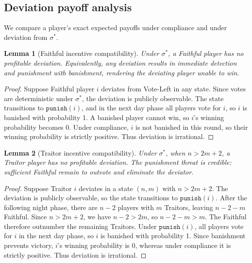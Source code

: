 \documentclass[11pt,a4paper]{article}
\newtheorem{lemma}{Lemma}
\begin{document}
\subsection{Deviation payoff analysis}

We compare a player's exact expected payoffs under compliance and under
deviation from \(\sigma^*\). 

\begin{lemma}[Faithful incentive compatibility]\label{lemma:faithful}
Under \(\sigma^*\), a Faithful player has no profitable deviation.
Equivalently, any deviation results in immediate detection and punishment
with banishment, rendering the deviating player unable to win.
\end{lemma}

\begin{proof}
Suppose Faithful player \(i\) deviates from Vote-Left in any state. Since
votes are deterministic under \(\sigma^*\), the deviation is publicly
observable. The state transitions to \(\mathtt{punish}(i)\), and in the
next day phase all players vote for \(i\), so \(i\) is banished with
probability 1. A banished player cannot win, so \(i\)'s winning probability
becomes 0. Under compliance, \(i\) is not banished in this round, so their
winning probability is strictly positive. Thus deviation is irrational.
\end{proof}

\begin{lemma}[Traitor incentive compatibility]\label{lemma:traitor}
Under \(\sigma^*\), when \(n > 2m + 2\), a Traitor player has no
profitable deviation. The punishment threat is credible: sufficient
Faithful remain to outvote and eliminate the deviator.
\end{lemma}

\begin{proof}
Suppose Traitor \(i\) deviates in a state \((n, m)\) with \(n > 2m + 2\).
The deviation is publicly observable, so the state transitions to
\(\mathtt{punish}(i)\). After the following night phase, there are \(n - 2\)
players with \(m\) Traitors, leaving \(n - 2 - m\) Faithful. Since \(n > 2m +
2\), we have \(n - 2 > 2m\), so \(n - 2 - m > m\). The Faithful therefore
outnumber the remaining Traitors. Under \(\mathtt{punish}(i)\), all players
vote for \(i\) in the next day phase, so \(i\) is banished with probability 1.
Since banishment prevents victory, \(i\)'s winning probability is 0, whereas
under compliance it is strictly positive. Thus deviation is irrational.
\end{proof}
\end{document}

